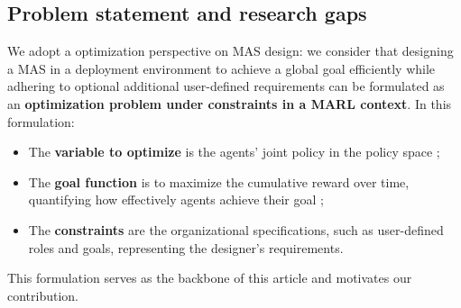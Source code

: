 \documentclass[pdflatex,sn-mathphys-num]{sn-jnl}%
\theoremstyle{thmstyleone}%
\theoremstyle{thmstyletwo}%
\theoremstyle{thmstylethree}%
\begin{document}

\subsection{Problem statement and research gaps}

We adopt a optimization perspective on MAS design: we consider that designing a MAS in a deployment environment to achieve a global goal efficiently while adhering to optional additional user-defined requirements can be formulated as an \textbf{optimization problem under constraints in a MARL context}. In this formulation:
\begin{itemize}
    \item The \textbf{variable to optimize} is the agents' joint policy in the policy space ;
    \item The \textbf{goal function} is to maximize the cumulative reward over time, quantifying how effectively agents achieve their goal ;
    \item The \textbf{constraints} are the organizational specifications, such as user-defined roles and goals, representing the designer's requirements.
\end{itemize}
This formulation serves as the backbone of this article and motivates our contribution. 
\end{document}
